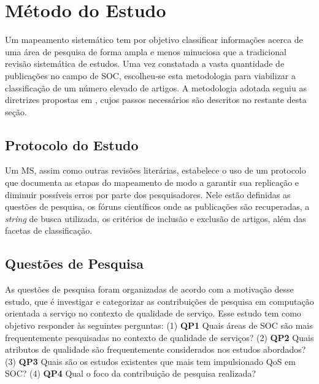 
\section{Método do Estudo}\label{sec:review_method}

Um mapeamento sistemático tem por objetivo classificar informações acerca de uma área de pesquisa de forma ampla e menos minuciosa que a tradicional revisão sistemática de estudos. Uma vez constatada a vasta quantidade de publicações no campo de SOC, escolheu-se esta metodologia para viabilizar a classifica\c c\~{a}o de um número elevado de artigos. A metodologia adotada seguiu as diretrizes propostas em \cite{petersen:sms2008}, cujos passos necess\'{a}rios s\~{a}o descritos no restante desta se\c c\~{a}o.

\subsection{Protocolo do Estudo}

Um MS, assim como outras revisões literárias, estabelece o uso de um protocolo que documenta as etapas do mapeamento de modo a garantir sua replicação e diminuir possíveis erros por parte dos pesquisadores. Nele estão definidas as questões de pesquisa, os fóruns científicos onde as publicações s\~{a}o recuperadas, a \textit{string} de busca utilizada, os critérios de inclusão e exclusão de artigos, além das facetas de classificação.

\subsection{Quest\~{o}es de Pesquisa}\label{sec:questoesPesquisa}

As questões de pesquisa foram organizadas de acordo com a motivação desse estudo, que é investigar e categorizar as contribuições de pesquisa em computação orientada a serviço no contexto de qualidade de serviço. Esse estudo tem como objetivo responder às seguintes perguntas: (1) \textbf{QP1} Quais áreas de SOC são mais frequentemente pesquisadas no contexto de qualidade de serviços? (2) \textbf{QP2} Quais atributos de qualidade são frequentemente considerados nos estudos abordados? (3) \textbf{QP3} Quais s\~{a}o os estudos existentes que mais tem impulsionado QoS em SOC? (4) \textbf{QP4} Qual o foco da contribuição de pesquisa realizada?

